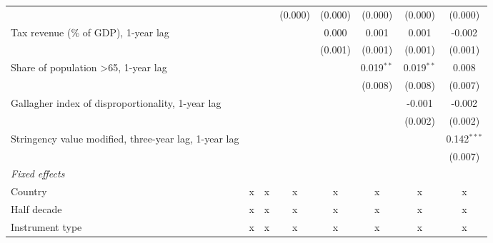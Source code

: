 \begin{tabular}{lccccccc}
                                                                     &                &               & (0.000)        & (0.000)        & (0.000)        & (0.000)        & (0.000)\\   
   Tax revenue (\% of GDP), 1-year lag                               &                &               &                & 0.000          & 0.001          & 0.001          & -0.002\\   
                                                                     &                &               &                & (0.001)        & (0.001)        & (0.001)        & (0.001)\\   
   Share of population >65, 1-year lag                               &                &               &                &                & 0.019$^{**}$   & 0.019$^{**}$   & 0.008\\   
                                                                     &                &               &                &                & (0.008)        & (0.008)        & (0.007)\\   
   Gallagher index of disproportionality, 1-year lag                 &                &               &                &                &                & -0.001         & -0.002\\   
                                                                     &                &               &                &                &                & (0.002)        & (0.002)\\   
   Stringency value modified, three-year lag, 1-year lag             &                &               &                &                &                &                & 0.142$^{***}$\\   
                                                                     &                &               &                &                &                &                & (0.007)\\   
   \emph{Fixed effects}\\
   Country                                                           & x              & x             & x              & x              & x              & x              & x\\  
   Half decade                                                       & x              & x             & x              & x              & x              & x              & x\\  
   Instrument type                                                   & x              & x             & x              & x              & x              & x              & x\\  

\end{tabular}
